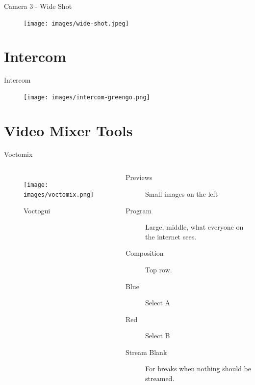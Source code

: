 \documentclass[aspectratio=169]{beamer}
\begin{document}
\begin{frame}{Camera 3 - Wide Shot}
	\begin{figure} 
		\centering
		\texttt{[image: images/wide-shot.jpeg]}
	\end{figure}
\end{frame}

\section{Intercom} %
 \begin{frame}{Intercom}
 	\begin{figure} 
 		\centering
 		\texttt{[image: images/intercom-greengo.png]}
 	\end{figure}
\end{frame}

\section{Video Mixer Tools}

\begin{frame}{Voctomix}
	\begin{columns}[T,onlytextwidth]
	\begin{figure} 
		\centering
		\texttt{[image: images/voctomix.png]}
		\caption{Voctogui}
		\label{fig:voctogui1}
	\end{figure}

	\begin{description}
		\item[Previews] Small images on the left 
		\item[Program] Large, middle, what everyone on the internet sees.
		\item[Composition] Top row.
		\item[Blue] Select A
		\item[Red] Select B
		\item[Stream Blank] For breaks when nothing should be streamed.
     \end{description}
	\end{columns}
\end{frame}
\end{document}
